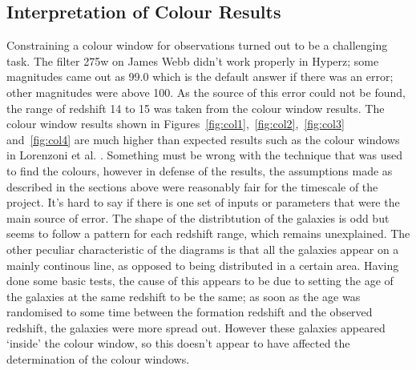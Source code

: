 	\subsection{Interpretation of Colour Results}
	\label{sub:Interp_Colour}
		Constraining a colour window for observations turned out to be a challenging task. The filter 275w on James Webb didn't work properly in Hyperz; some magnitudes came out as 99.0 which is the default answer if there was an error; other magnitudes were above 100. As the source of this error could not be found, the range of redshift 14 to 15 was taken from the colour window results. The colour window results  shown in Figures~\ref{fig:col1},~\ref{fig:col2},~\ref{fig:col3} and~\ref{fig:col4} are much higher than expected results such as the colour windows in Lorenzoni et al. \cite{lorenzoni2013constraining}. Something must be wrong with the technique that was used to find the colours, however in defense of the results, the assumptions made as described in the sections above were reasonably fair for the timescale of the project. It's hard to say if there is one set of inputs or parameters that were the main source of error.  The shape of the distribtution of the galaxies is odd but seems to follow a pattern for each redshift range, which remains unexplained. The other peculiar characteristic of the diagrams is that all the galaxies appear on a mainly continous line, as opposed to being distributed in a certain area. Having done some basic tests, the cause of this appears to be due to setting the age of the galaxies at the same redshift to be the same; as soon as the age was randomised to some time between the formation redshift and the observed redshift, the galaxies were more spread out. However these galaxies appeared `inside' the colour window, so this doesn't appear to have affected the determination of the colour windows.
